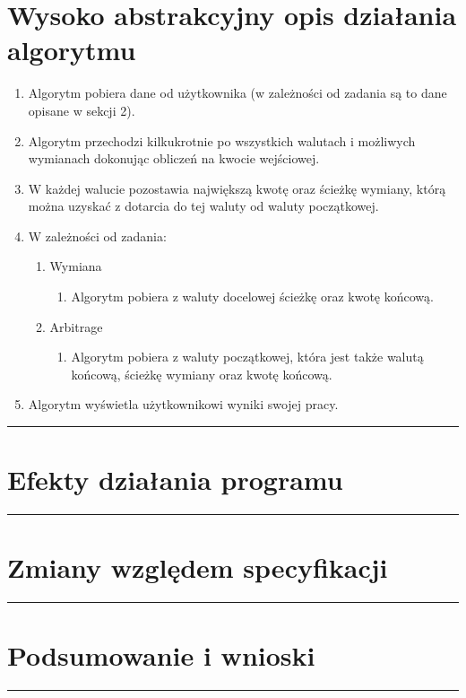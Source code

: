 \documentclass[a4paper,11pt]{article}
\newcommand{\linia}{\rule{\linewidth}{0.4mm}}
\begin{document}
\section{Wysoko abstrakcyjny opis działania algorytmu}
\begin{enumerate}
\item Algorytm pobiera dane od użytkownika (w zależności od zadania są to dane opisane w sekcji 2).
\item Algorytm przechodzi kilkukrotnie po wszystkich walutach i możliwych wymianach dokonując obliczeń na kwocie wejściowej.
\item W każdej walucie pozostawia największą kwotę oraz ścieżkę wymiany, którą można uzyskać z dotarcia do tej waluty od waluty początkowej.
\item W zależności od zadania:
\begin{enumerate}
\item Wymiana
\begin{enumerate}
\item Algorytm pobiera z waluty docelowej ścieżkę oraz kwotę końcową.
\end{enumerate}
\item Arbitrage
\begin{enumerate}
\item Algorytm pobiera z waluty początkowej, która jest także walutą końcową, ścieżkę wymiany oraz kwotę końcową.
\end{enumerate}
\end{enumerate}
\item Algorytm wyświetla użytkownikowi wyniki swojej pracy.
\end{enumerate}
\noindent\linia
\section{ Efekty działania programu}
\noindent\linia
\section{Zmiany względem specyfikacji}

\noindent\linia
\section{Podsumowanie i wnioski}

\noindent\linia
\end{document}
